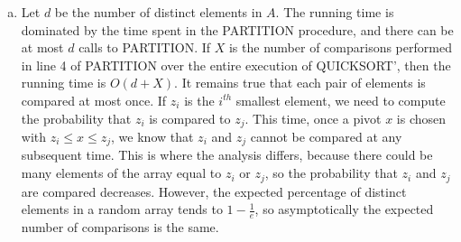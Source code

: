 \documentclass{article}
\begin{document}
\begin{enumerate}[a.]
\item Let $d$ be the number of distinct elements in $A$.  The running time is dominated by the time spent in the PARTITION procedure, and there can be at most $d$ calls to PARTITION.  If $X$ is the number of comparisons performed in line 4 of PARTITION over the entire execution of QUICKSORT', then the running time is $O(d+X)$. It remains true that each pair of elements is compared at most once. If $z_i$ is the $i^{th}$ smallest element, we need to compute the probability that $z_i$ is compared to $z_j$. This time, once a pivot $x$ is chosen with $z_i \leq x \leq z_j$, we know that $z_i$ and $z_j$ cannot be compared at any subsequent time. This is where the analysis differs, because there could be many elements of the array equal to $z_i$ or $z_j$, so the probability that $z_i$ and $z_j$ are compared decreases. However, the expected percentage of distinct elements in a random array tends to $1-\frac{1}{e}$, so asymptotically the expected number of comparisons is the same. 
\end{enumerate}
\end{document}
